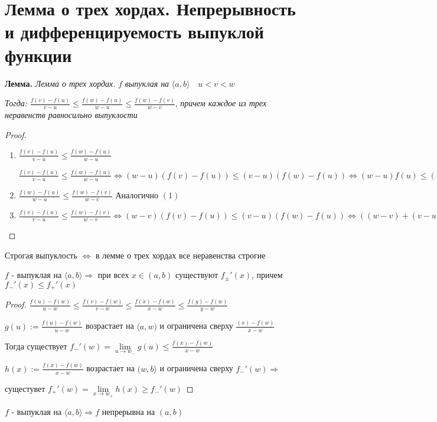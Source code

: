 \section{Лемма о трех хордах. Непрерывность и дифференцируемость выпуклой функции}

\textbf{Лемма.}
\textit{
    Лемма о трех хордах.
} \quad $f$ \textit{
    выпуклая на 
} $\langle a, b \rangle \quad u < v < w$

\textit{Тогда: }$\frac{f(v) - f(u)}{v - u} \leqslant \frac{f(w) - f(u)}{w - u} \leqslant \frac{f(w) - f(v)}{w - v}$,
\textit{
    причем каждое из трех неравенств равносильно выпуклости
}
\begin{proof} \quad 

    \begin{enumerate} 
        \item $\frac{f(v) - f(u)}{v - u} \leqslant \frac{f(w) - f(u)}{w - u}$

        $\frac{f(v) - f(u)}{v - u} \leqslant \frac{f(w) - f(u)}{w - u} \Longleftrightarrow (w - u)
        (f(v) - f(u)) \leqslant (v - u)(f(w) - f(u)) \Longleftrightarrow (w-u)f(u) \leqslant
        ((w - u) - (v - u))f(u) + (v - u)f(w)$
        \item $\frac{f(w) - f(u)}{w - u} \leqslant \frac{f(w) - f(v)}{w - v}$ \qquad
        Аналогично $(1)$
        \item $\frac{f(v) - f(u)}{v - u} \leqslant \frac{f(w) - f(v)}{w - v} \Longleftrightarrow (w - v)
        (f(v) - f(u)) \leqslant (v - u)(f(w) - f(u)) \Longleftrightarrow ((w - v) + (v - u))f(v) \leqslant (w - v)f(u) +
        (v - u)f(w)$
    \end{enumerate}
\end{proof}

\notice \; Строгая выпуклость $\Longleftrightarrow$ в лемме о трех хордах все неравенства строгие

\begin{theorem-non}
    $f$ - выпуклая на $\langle a, b \rangle \Longrightarrow$ при всех $x \in (a, b)$
    существуют $f_{\pm}'(x)$, причем $f_{-}'(x) \leqslant f_{+}'(x)$

    \begin{proof}
        $\frac{f(u) - f(w)}{u - w} \leqslant \frac{f(v) - f(w)}{v - w} \leqslant \frac{f(x) - f(w)}{x - w} \leqslant \frac{f(y) - f(w)}{y - w}$

        $g(u) := \frac{f(u) - f(w)}{u - w}$ возрастает на $\langle a, w)$ и ограничена сверху 
        $\frac{(x) - f(w)}{x - w}$

        Тогда существует $f_{-}'(w) = \lim\limits_{u \longrightarrow w_{-}}{g(u)} \leqslant \frac{f(x) - f(w)}{x - w}$

        $h(x) := \frac{f(x) - f(w)}{x - w}$ возрастает на $( w, b \rangle$ и ограничена сверху 
        $f_{-}'(w) \Longrightarrow$ 
        
        сущестувет $f_{+}'(w) = \lim\limits_{x \longrightarrow w_{+}}{h(x)} \geqslant f_{-}'(w) $
    \end{proof}
\end{theorem-non}

\follow \; $f$ - выпуклая на $\langle a, b \rangle \Longrightarrow f$ непрерывна на $(a, b)$ 
